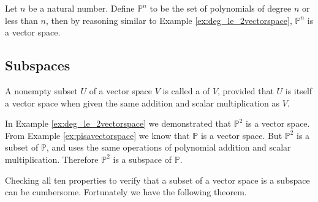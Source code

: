 \documentclass{ximera}
\begin{document}
\begin{example}\label{ex:pnisavectorspace}
Let $n$ be a natural number.  Define $\mathbb{P}^n$ to be the set of polynomials of degree $n$ or less than $n$, then by reasoning similar to Example \ref{ex:deg_le_2vectorspace}, $\mathbb{P}^n$ is a vector space.
\end{example}

\subsection*{Subspaces}
\begin{definition}\label{def:subspaceabstract}
A nonempty subset $U$ of a vector space $V$ is called a  of $V$, provided that $U$ is itself a vector space when given the same addition and scalar multiplication as $V$.
\end{definition}

\begin{example}\label{ex:subspaceabstract1}
In Example \ref{ex:deg_le_2vectorspace} we demonstrated that $\mathbb{P}^2$ is a vector space.  From Example \ref{ex:pisavectorspace} we know that $\mathbb{P}$ is a vector space. But $\mathbb{P}^2$ is a subset of $\mathbb{P}$, and uses the same operations of polynomial addition and scalar multiplication.  Therefore $\mathbb{P}^2$ is a subspace of $\mathbb{P}$.
\end{example}

Checking all ten properties to verify that a subset of a vector space is a subspace can be cumbersome.  Fortunately we have the following theorem.
\end{document}
